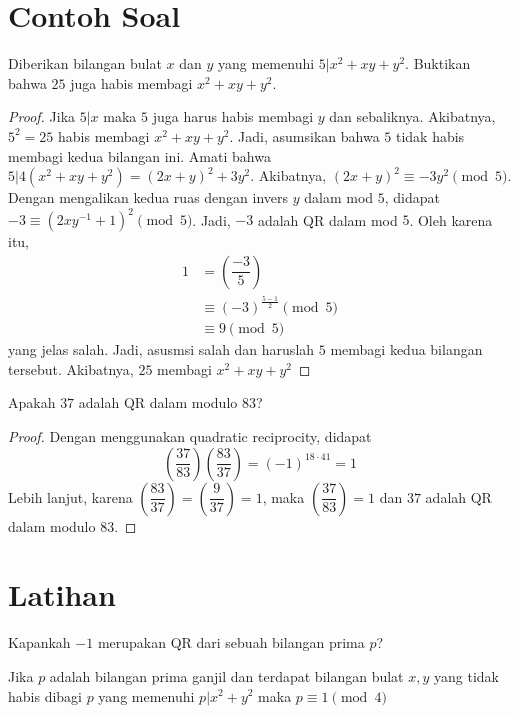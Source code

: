 \documentclass[11pt]{scrartcl}
\begin{document}
\section{Contoh Soal}
\begin{example}
    Diberikan bilangan bulat $x$ dan $y$ yang memenuhi $5|x^2 + xy + y^2$. Buktikan bahwa $25$ juga habis membagi $x^2 + xy + y^2$.
\end{example}
\begin{proof}
    Jika $5|x$ maka $5$ juga harus habis membagi $y$ dan sebaliknya. Akibatnya, $5^2 = 25$ habis membagi $x^2 + xy + y^2$. Jadi, asumsikan bahwa $5$ tidak habis membagi kedua bilangan ini. Amati bahwa $5|4(x^2 + xy + y^2) = (2x + y)^2 + 3y^2$. Akibatnya, $(2x + y)^2 \equiv -3y^2 \pmod{5}$. Dengan mengalikan kedua ruas dengan invers $y$ dalam mod $5$, didapat $-3 \equiv (2xy^{-1} + 1)^2 \pmod{5}$. Jadi, $-3$ adalah QR dalam mod $5$. Oleh karena itu, 
    \begin{align*}
        1 &= \left(\dfrac{-3}{5}\right) \\
        &\equiv (-3)^{\frac{5 - 1}{2}} \pmod{5}\\
        &\equiv 9 \pmod{5}
    \end{align*}
    yang jelas salah. Jadi, asusmsi salah dan haruslah $5$ membagi kedua bilangan tersebut. Akibatnya, $25$ membagi $x^2 + xy + y^2$
\end{proof}

\begin{example}
    Apakah $37$ adalah QR dalam modulo $83$?
\end{example}

\begin{proof}
    Dengan menggunakan quadratic reciprocity, didapat \[\left(\dfrac{37}{83}\right)\left(\dfrac{83}{37}\right) = (-1)^{18\cdot 41} = 1\] Lebih lanjut, karena $\left(\dfrac{83}{37}\right) = \left(\dfrac{9}{37}\right) = 1$, maka $\left(\dfrac{37}{83}\right) = 1$ dan $37$ adalah QR dalam modulo $83$.
\end{proof}

\section{Latihan}
\begin{problem}
    Kapankah $-1$ merupakan QR dari sebuah bilangan prima $p$?
\end{problem}

\begin{problem}
    Jika $p$ adalah bilangan prima ganjil dan terdapat bilangan bulat $x, y$ yang tidak habis dibagi $p$ yang memenuhi $p|x^2 + y^2$ maka $p \equiv 1 \pmod{4}$
\end{problem}
\end{document}
